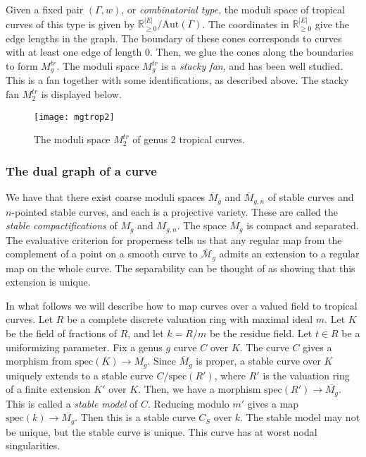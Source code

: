 Given a fixed pair $(\Gamma, w)$, or \emph{combinatorial type}, the moduli space of tropical curves of this type is given by $\mathbb{R}_{\geq 0}^{|E|} / \text{Aut}(\Gamma)$. The coordinates in $\mathbb{R}_{\geq 0}^{|E|}$ give the edge lengths in the graph. The boundary of these cones corresponds to curves with at least one edge of length 0. Then, we glue the cones along the boundaries to form $M_g^{tr}$. The moduli space  $M_g^{tr}$ is a \emph{stacky fan}, and has been well studied. This is a fan together with some identifications, as described above. The stacky fan $M_2^{tr}$ is displayed below.

 \begin{figure}[h]
\centering
  \texttt{[image: mgtrop2]}
  \caption{The moduli space $M_2^{tr}$ of genus 2 tropical curves.}
  \label{mgtrop}
\end{figure}

\subsubsection{The dual graph of a curve}
We have that there exist coarse moduli spaces $\overline{M}_g$ and $\overline{M}_{g,n}$ of stable curves and $n$-pointed stable curves, and each is a projective variety. These are called the \emph{stable compactifications} of $M_g$ and $M_{g,n}$. The space $\overline{M}_g$ is compact and separated.
The evaluative criterion for properness tells us that any regular map from the complement of a point on a smooth curve to $\overline{\mathcal{M}}_g$ admits an extension to a regular map on the whole curve. The separability can be thought of as showing that this extension is unique. 

In what follows we will describe how to map curves over a valued field to tropical curves. Let $R$ be a complete discrete valuation ring with maximal ideal $m$. Let $K$ be the field of fractions of $R$, and let $k = R/m$ be the residue field. Let $t \in R$ be a uniformizing parameter. Fix a genus $g$ curve $C$ over $K$. The curve $C$ gives a morphism from $\text{spec}(K) \rightarrow M_{g}$. Since $\overline{M}_g$ is proper, a stable curve over $K$ uniquely extends to a stable curve $C / \text{spec}(R')$, where $R'$ is the valuation ring of a finite extension $K'$ over $K$. Then, we have a morphism $\text{spec}(R') \rightarrow \overline{M_{g}}$. This is called a \emph{stable model} of $C$. Reducing modulo $m'$ gives a map $\text{spec}(k) \rightarrow \overline{M_{g}}$. Then this is a stable curve $C_S$ over $k$. The stable model may not be unique, but the stable curve is unique. This curve has at worst nodal singularities.

